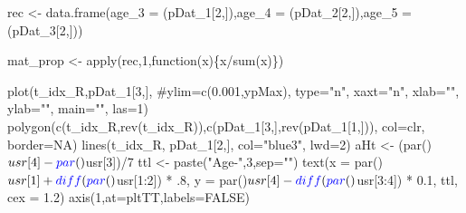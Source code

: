 \documentclass[11pt,]{article}
\newenvironment{Shaded}{}{}
\newcommand{\KeywordTok}[1]{\textcolor[rgb]{0.00,0.00,1.00}{#1}}
\newcommand{\DataTypeTok}[1]{#1}
\newcommand{\DecValTok}[1]{#1}
\newcommand{\FloatTok}[1]{#1}
\newcommand{\StringTok}[1]{\textcolor[rgb]{0.00,0.50,0.50}{#1}}
\newcommand{\CommentTok}[1]{\textcolor[rgb]{0.00,0.50,0.00}{#1}}
\newcommand{\OtherTok}[1]{\textcolor[rgb]{1.00,0.25,0.00}{#1}}
\newcommand{\ControlFlowTok}[1]{\textcolor[rgb]{0.00,0.00,1.00}{#1}}
\newcommand{\OperatorTok}[1]{#1}
\newcommand{\NormalTok}[1]{#1}
\begin{document}
\begin{Shaded}
\begin{Highlighting}[]
\NormalTok{rec <-}\StringTok{ }\KeywordTok{data.frame}\NormalTok{(}\DataTypeTok{age_3 =}\NormalTok{ (pDat_}\DecValTok{1}\NormalTok{[}\DecValTok{2}\NormalTok{,]),}\DataTypeTok{age_4 =}\NormalTok{ (pDat_}\DecValTok{2}\NormalTok{[}\DecValTok{2}\NormalTok{,]),}\DataTypeTok{age_5 =}\NormalTok{ (pDat_}\DecValTok{3}\NormalTok{[}\DecValTok{2}\NormalTok{,]))}


\NormalTok{mat_prop <-}\StringTok{ }\KeywordTok{apply}\NormalTok{(rec,}\DecValTok{1}\NormalTok{,}\ControlFlowTok{function}\NormalTok{(x)\{x}\OperatorTok{/}\KeywordTok{sum}\NormalTok{(x)\})}

    \KeywordTok{plot}\NormalTok{(t_idx_R,pDat_}\DecValTok{1}\NormalTok{[}\DecValTok{3}\NormalTok{,], }\CommentTok{#ylim=c(0.001,ypMax),}
         \DataTypeTok{type=}\StringTok{"n"}\NormalTok{, }\DataTypeTok{xaxt=}\StringTok{"n"}\NormalTok{, }\DataTypeTok{xlab=}\StringTok{""}\NormalTok{, }\DataTypeTok{ylab=}\StringTok{""}\NormalTok{, }\DataTypeTok{main=}\StringTok{""}\NormalTok{, }\DataTypeTok{las=}\DecValTok{1}\NormalTok{)}
    \KeywordTok{polygon}\NormalTok{(}\KeywordTok{c}\NormalTok{(t_idx_R,}\KeywordTok{rev}\NormalTok{(t_idx_R)),}\KeywordTok{c}\NormalTok{(pDat_}\DecValTok{1}\NormalTok{[}\DecValTok{3}\NormalTok{,],}\KeywordTok{rev}\NormalTok{(pDat_}\DecValTok{1}\NormalTok{[}\DecValTok{1}\NormalTok{,])), }\DataTypeTok{col=}\NormalTok{clr, }\DataTypeTok{border=}\OtherTok{NA}\NormalTok{)}
    \KeywordTok{lines}\NormalTok{(t_idx_R, pDat_}\DecValTok{1}\NormalTok{[}\DecValTok{2}\NormalTok{,], }\DataTypeTok{col=}\StringTok{"blue3"}\NormalTok{, }\DataTypeTok{lwd=}\DecValTok{2}\NormalTok{)}
\NormalTok{    aHt <-}\StringTok{ }\NormalTok{(}\KeywordTok{par}\NormalTok{()}\OperatorTok{$}\NormalTok{usr[}\DecValTok{4}\NormalTok{]}\OperatorTok{-}\KeywordTok{par}\NormalTok{()}\OperatorTok{$}\NormalTok{usr[}\DecValTok{3}\NormalTok{])}\OperatorTok{/}\DecValTok{7}
\NormalTok{    ttl <-}\StringTok{ }\KeywordTok{paste}\NormalTok{(}\StringTok{"Age-"}\NormalTok{,}\DecValTok{3}\NormalTok{,}\DataTypeTok{sep=}\StringTok{""}\NormalTok{)}
    \KeywordTok{text}\NormalTok{(}\DataTypeTok{x =} \KeywordTok{par}\NormalTok{()}\OperatorTok{$}\NormalTok{usr[}\DecValTok{1}\NormalTok{] }\OperatorTok{+}\StringTok{ }\KeywordTok{diff}\NormalTok{(}\KeywordTok{par}\NormalTok{()}\OperatorTok{$}\NormalTok{usr[}\DecValTok{1}\OperatorTok{:}\DecValTok{2}\NormalTok{]) }\OperatorTok{*}\StringTok{ }\NormalTok{.}\DecValTok{8}\NormalTok{,}
       \DataTypeTok{y =} \KeywordTok{par}\NormalTok{()}\OperatorTok{$}\NormalTok{usr[}\DecValTok{4}\NormalTok{] }\OperatorTok{-}\StringTok{ }\KeywordTok{diff}\NormalTok{(}\KeywordTok{par}\NormalTok{()}\OperatorTok{$}\NormalTok{usr[}\DecValTok{3}\OperatorTok{:}\DecValTok{4}\NormalTok{]) }\OperatorTok{*}\StringTok{ }\FloatTok{0.1}\NormalTok{,}
\NormalTok{       ttl,}
       \DataTypeTok{cex =} \FloatTok{1.2}\NormalTok{)}
    \KeywordTok{axis}\NormalTok{(}\DecValTok{1}\NormalTok{,}\DataTypeTok{at=}\NormalTok{pltTT,}\DataTypeTok{labels=}\OtherTok{FALSE}\NormalTok{)}
    

\end{Highlighting}
\end{Shaded}
\end{document}
